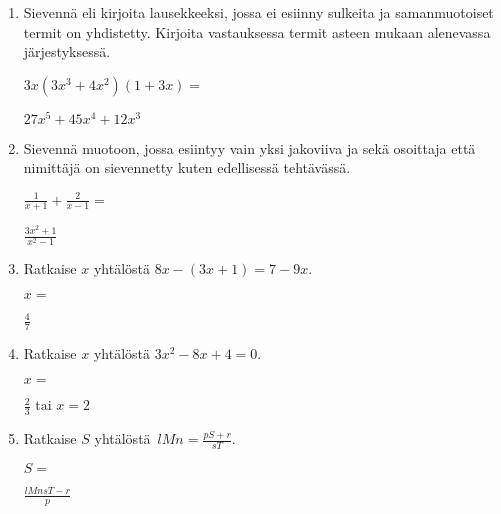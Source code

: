 \documentclass[finnish, a4paper, 12pt]{article}
\begin{document}
\begin{enumerate}[leftmargin=*]
		\vspace{8pt}
		
		\item %
		Sievennä eli kirjoita lausekkeeksi, jossa ei esiinny sulkeita ja 
		samanmuotoiset termit on yhdistetty. 
		Kirjoita vastauksessa termit asteen mukaan alenevassa järjestyksessä. 
		
		\(
		\displaystyle
		3x(3x^3 + 4x^2)(1 + 3x) = 
		\) %
		\begin{version:withAnswers}
		\( 27x^5 +45x^4 +12x^3 \)
		\end{version:withAnswers}
		
		\vspace{8pt}
		
		\item %
		Sievennä %
		muotoon, jossa esiintyy vain yksi jakoviiva ja sekä osoittaja
		että nimittäjä on sievennetty kuten edellisessä tehtävässä.
		
		\(
		\displaystyle
		\frac{1}{x+1}+ \frac{ 2}{x - 1} =
		\) %
		\begin{version:withAnswers}
		\( \frac{3x^2 + 1}{x^2  - 1} \)
		\end{version:withAnswers}
		
		\vspace{8pt}
		
		\item %
		Ratkaise \(x\) yhtälöstä \(8x - (3x+1) = 7 - 9x\).
		
		\(
		x = 
		\)	%
		\begin{version:withAnswers}
		 \( \frac{4}{7} \)
		\end{version:withAnswers}
		\vspace{8pt}
		
		\item %
		Ratkaise \(x\) yhtälöstä \(3 x^2  - 8 x + 4= 0\).
		
		\(
		x = 		
		\)	%
		
		\begin{version:withAnswers}
		\(\frac{2}{3} \text{  tai } x = 2\)
		\end{version:withAnswers}
		\vspace{8pt}
		
		\item %
		Ratkaise \(S\) yhtälöstä 
		\(
		\displaystyle \,
		lMn = \frac{pS+r}{sT} .
		\)	
		
		\(
		S = 
		\) %
		\begin{version:withAnswers}
		\( \frac{lMnsT -r}{p}\)
		\end{version:withAnswers}
		
	\end{enumerate}
	
	
\end{document}
